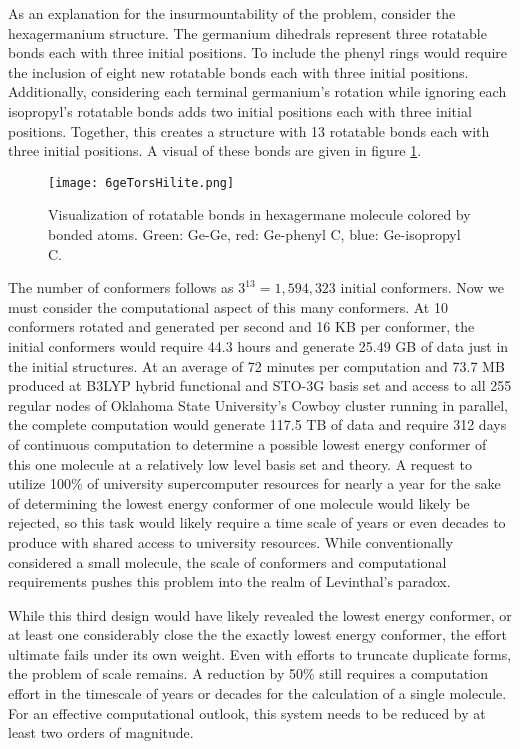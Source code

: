 As an explanation for the insurmountability of the problem, consider the hexagermanium structure. 
The germanium dihedrals represent three rotatable bonds each with three initial positions. 
To include the phenyl rings would require the inclusion of eight new rotatable bonds each with three initial positions.
Additionally, considering each terminal germanium's rotation while ignoring each isopropyl's rotatable bonds adds two initial positions each with three initial positions. 
Together, this creates a structure with 13 rotatable bonds each with three initial positions.
A visual of these bonds are given in figure \ref{fig:6geTorsHilite}.
\begin{figure}
	
	\centering
	
	\texttt{[image: 6geTorsHilite.png]}
	
	\caption{Visualization of rotatable bonds in hexagermane molecule colored by bonded atoms. Green: Ge-Ge, red: Ge-phenyl C, blue: Ge-isopropyl C.}
	
	\label{fig:6geTorsHilite}
	
\end{figure}
The number of conformers follows as $3^{13} = 1,594,323$ initial conformers. 
Now we must consider the computational aspect of this many conformers.
At 10 conformers rotated and generated per second and 16 KB per conformer, the initial conformers would require 44.3 hours and generate 25.49 GB of data just in the initial structures.
At an average of 72 minutes per computation and 73.7 MB produced at B3LYP hybrid functional and STO-3G basis set and access to all 255 regular nodes of Oklahoma State University's Cowboy cluster running in parallel, the complete computation would generate 117.5 TB of data and require 312 days of continuous computation to determine a possible lowest energy conformer of this one molecule at a relatively low level basis set and theory.
A request to utilize 100\% of university supercomputer resources for nearly a year for the sake of determining the lowest energy conformer of one molecule would likely be rejected, so this task would likely require a time scale of years or even decades to produce with shared access to university resources. 
While conventionally considered a small molecule, the scale of conformers and computational requirements pushes this problem into the realm of Levinthal's paradox.

While this third design would have likely revealed the lowest energy conformer, or at least one considerably close the the exactly lowest energy conformer, the effort ultimate fails under its own weight.
Even with efforts to truncate duplicate forms, the problem of scale remains.
A reduction by 50\% still requires a computation effort in the timescale of years or decades for the calculation of a single molecule.
For an effective computational outlook, this system needs to be reduced by at least two orders of magnitude.

